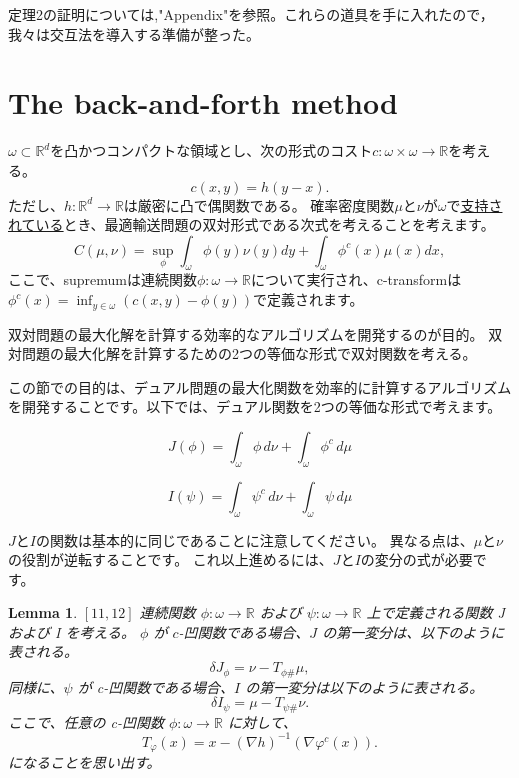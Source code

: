 \documentclass{jsarticle}
\newtheorem{lem}[thm]{Lemma}
\theoremstyle{definition}
\begin{document}
定理2の証明については,"Appendix"を参照。これらの道具を手に入れたので，我々は交互法を導入する準備が整った。


\section{The back-and-forth method}
\label{sect:the back-and-forth method}

$\omega \subset \mathbb{R}^d$を凸かつコンパクトな領域とし、次の形式のコスト$c: \omega \times \omega \to \mathbb{R}$を考える。
$$
c(x,y) = h(y - x).
$$
ただし、$h: \mathbb{R}^d \to \mathbb{R}$は厳密に凸で偶関数である。
確率密度関数$\mu$と$\nu$が$\omega$で\hyperlink{支持されている}{支持されている}とき、最適輸送問題の双対形式である次式を考えることを考えます。
\begin{equation}
  C(\mu,\nu) = \sup_{\phi}\int_{\omega}\phi(y)\nu(y)dy + \int_{\omega}\phi^c(x)\mu(x)dx,
\end{equation}
ここで、supremumは連続関数$\phi:\omega \to \mathbb{R}$について実行され、c-transformは$\phi^c(x) = \inf_{y\in\omega}(c(x,y)-\phi(y))$で定義されます。

双対問題の最大化解を計算する効率的なアルゴリズムを開発するのが目的。
双対問題の最大化解を計算するための2つの等価な形式で双対関数を考える。


この節での目的は、デュアル問題の最大化関数を効率的に計算するアルゴリズムを開発することです。以下では、デュアル関数を2つの等価な形式で考えます。

\begin{equation}
  J(\phi) = \int_\omega \phi \, d\nu + \int_\omega \phi^c \, d\mu 
\end{equation}

\begin{equation}
  I(\psi) = \int_\omega \psi^c \, d\nu + \int_\omega \psi \, d\mu
\end{equation}

$J$と$I$の関数は基本的に同じであることに注意してください。
異なる点は、$\mu$と$\nu$の役割が逆転することです。
これ以上進めるには、$J$と$I$の変分の式が必要です。

\begin{lem}
  $\left[11,12 \right]$ 
  連続関数 $\phi: \omega \rightarrow \mathbb{R}$ および $\psi: \omega \rightarrow \mathbb{R}$ 上で定義される関数 J および I を考える。
  $\phi$ が $c$-凹関数である場合、$J$ の第一変分は、以下のように表される。
  $$
  \delta J_\phi = \nu - T_{\phi \#} \mu,
  $$
  同様に、$\psi$ が c-凹関数である場合、$I$ の第一変分は以下のように表される。
  $$
  \delta I_\psi = \mu - T_{\psi \# }\nu.
  $$
  ここで、任意の c-凹関数 $\phi: \omega \rightarrow \mathbb{R}$ に対して、
  $$
  T_\varphi(x) = x - (\nabla h)^{-1}(\nabla \varphi^c(x)).
  $$
  になることを思い出す。
\end{lem}
\end{document}

